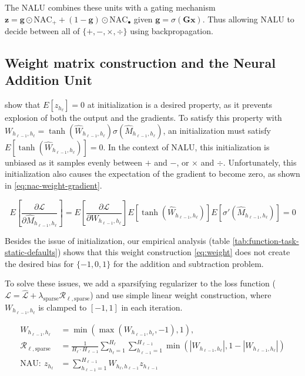 The NALU combines these units with a gating mechanism $\mathbf{z} = \mathbf{g} \odot \text{NAC}_{+} + (1 - \mathbf{g}) \odot \text{NAC}_{\bullet}$ given $\mathbf{g} = \sigma(\mathbf{G} \mathbf{x})$. Thus allowing NALU to decide between all of $\{+, -, \times, \div\}$ using backpropagation.

\subsection{Weight matrix construction  and the Neural Addition Unit}\label{sssec:weight}

\citet{glorot-initialization} show that $E[z_{h_\ell}] = 0$ at initialization is a desired property, as it prevents explosion of both the output and the gradients.
To satisfy this property with $W_{h_{\ell-1},h_\ell} = \tanh(\hat{W}_{h_{\ell-1},h_\ell}) \sigma(\hat{M}_{h_{\ell-1},h_\ell})$, an initialization must satisfy $E[\tanh(\hat{W}_{h_{\ell-1},h_\ell})] = 0$.
In the context of NALU, this initialization is unbiased as it samples evenly between $+$ and $-$, or $\times$ and $\div$.
Unfortunately, this initialization also causes the expectation of the gradient to become zero, as shown in \eqref{eq:nac-weight-gradient}.

\begin{equation}
E\left[\frac{\partial \mathcal{L}}{\partial \hat{M}_{h_{\ell-1},h_\ell}}\right] = E\left[\frac{\partial \mathcal{L}}{\partial W_{h_{\ell-1},h_\ell}}\right] E\left[\tanh(\hat{W}_{h_{\ell-1},h_\ell})\right] E\left[\sigma'(\hat{M}_{h_{\ell-1},h_\ell})\right] = 0
\label{eq:nac-weight-gradient}
\end{equation}

Besides the issue of initialization, our empirical analysis (table \ref{tab:function-task-static-defaults}) shows that this weight construction \eqref{eq:weight} does not create the desired bias for $\{-1, 0, 1\}$ for the addition and subtraction problem.

To solve these issues, we add a sparsifying regularizer to the loss function ($\mathcal{L} = \hat{\mathcal{L}} + \lambda_{\mathrm{sparse}} \mathcal{R}_{\ell,\mathrm{sparse}}$) and use simple linear weight construction, where $W_{h_{\ell-1},h_\ell}$ is clamped to $[-1, 1]$ in each iteration.

\begin{align}
W_{h_{\ell-1},h_\ell} &= \min(\max(W_{h_{\ell-1},h_\ell}, -1), 1), \\
\mathcal{R}_{\ell,\mathrm{sparse}} &= \frac{1}{H_\ell \cdot H_{\ell-1}} \sum_{h_\ell=1}^{H_\ell} \sum_{h_{\ell-1}=1}^{H_{\ell-1}} \min\left(|W_{h_{\ell-1},h_\ell}|, 1 - \left|W_{h_{\ell-1},h_\ell}\right|\right) \\
\textrm{NAU}:\ z_{h_\ell} &= \sum_{h_{\ell-1}=1}^{H_{\ell-1}} W_{h_{\ell}, h_{\ell-1}} z_{h_{\ell-1}}
\end{align}


